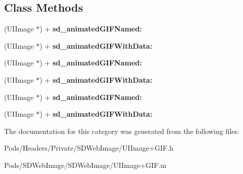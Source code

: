 \subsection*{Class Methods}
\begin{DoxyCompactItemize}
\item 
\mbox{\label{category_u_i_image_07_g_i_f_08_a11a7284b0069e0f2002f89c16cfbd448}} 
(U\+I\+Image $\ast$) + {\bfseries sd\+\_\+animated\+G\+I\+F\+Named\+:}
\item 
\mbox{\label{category_u_i_image_07_g_i_f_08_a8fc0cea75b8b1b1504bf2a173081dea2}} 
(U\+I\+Image $\ast$) + {\bfseries sd\+\_\+animated\+G\+I\+F\+With\+Data\+:}
\item 
\mbox{\label{category_u_i_image_07_g_i_f_08_a11a7284b0069e0f2002f89c16cfbd448}} 
(U\+I\+Image $\ast$) + {\bfseries sd\+\_\+animated\+G\+I\+F\+Named\+:}
\item 
\mbox{\label{category_u_i_image_07_g_i_f_08_a8fc0cea75b8b1b1504bf2a173081dea2}} 
(U\+I\+Image $\ast$) + {\bfseries sd\+\_\+animated\+G\+I\+F\+With\+Data\+:}
\item 
\mbox{\label{category_u_i_image_07_g_i_f_08_a11a7284b0069e0f2002f89c16cfbd448}} 
(U\+I\+Image $\ast$) + {\bfseries sd\+\_\+animated\+G\+I\+F\+Named\+:}
\item 
\mbox{\label{category_u_i_image_07_g_i_f_08_a8fc0cea75b8b1b1504bf2a173081dea2}} 
(U\+I\+Image $\ast$) + {\bfseries sd\+\_\+animated\+G\+I\+F\+With\+Data\+:}
\end{DoxyCompactItemize}


The documentation for this category was generated from the following files\+:\begin{DoxyCompactItemize}
\item 
Pods/\+Headers/\+Private/\+S\+D\+Web\+Image/U\+I\+Image+\+G\+I\+F.\+h\item 
Pods/\+S\+D\+Web\+Image/\+S\+D\+Web\+Image/U\+I\+Image+\+G\+I\+F.\+m\end{DoxyCompactItemize}
